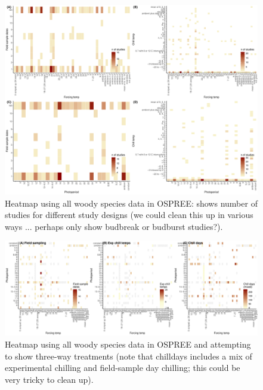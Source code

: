 \documentclass[11pt,letter]{article}
\begin{document}
\begin{figure}[t!]
\centering
\includegraphics[width=1\textwidth]{..//..//analyses/limitingcues/figures/heatallosp_4panel.pdf}
\caption{Heatmap using all woody species data in OSPREE: shows number of studies for different study designs (we could clean this up in various ways ... perhaps only show budbreak or budburst studies?).}
  \label{fig:heatmap4p}
\end{figure}


\begin{figure}[t!]
\centering
\includegraphics[width=1\textwidth]{..//..//analyses/limitingcues/figures/heatallosp_3treats.pdf}
\caption{Heatmap using all woody species data in OSPREE and attempting to show three-way treatments (note that chilldays includes a mix of experimental chilling and field-sample day chilling; this could be very tricky to clean up).}
  \label{fig:heatmap3p}
\end{figure}
\end{document}
